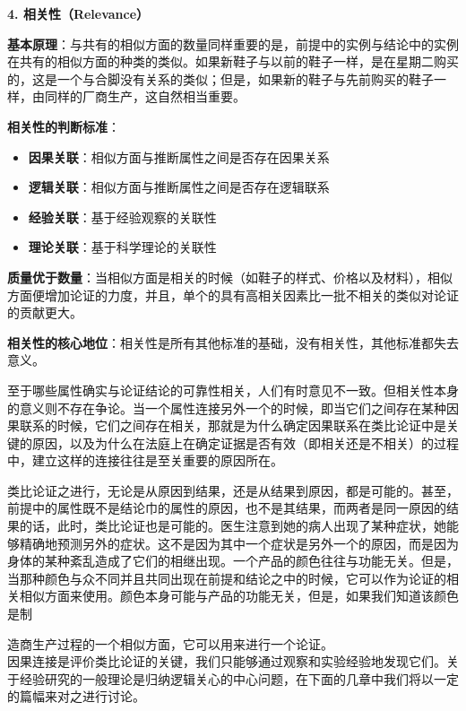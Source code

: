 \begin{theorembox}[title=标准四：相关性的核心地位]

\textbf{4. 相关性（Relevance）}

\textbf{基本原理}：与共有的相似方面的数量同样重要的是，前提中的实例与结论中的实例在共有的相似方面的种类的类似。如果新鞋子与以前的鞋子一样，是在星期二购买的，这是一个与合脚没有关系的类似；但是，如果新的鞋子与先前购买的鞋子一样，由同样的厂商生产，这自然相当重要。

\textbf{相关性的判断标准}：
\begin{itemize}
\item \textbf{因果关联}：相似方面与推断属性之间是否存在因果关系
\item \textbf{逻辑关联}：相似方面与推断属性之间是否存在逻辑联系
\item \textbf{经验关联}：基于经验观察的关联性
\item \textbf{理论关联}：基于科学理论的关联性
\end{itemize}

\textbf{质量优于数量}：当相似方面是相关的时候（如鞋子的样式、价格以及材料），相似方面便增加论证的力度，并且，单个的具有高相关因素比一批不相关的类似对论证的贡献更大。

\textbf{相关性的核心地位}：相关性是所有其他标准的基础，没有相关性，其他标准都失去意义。
\end{theorembox}

至于哪些属性确实与论证结论的可靠性相关，人们有时意见不一致。但相关性本身的意义则不存在争论。当一个属性连接另外一个的时候，即当它们之间存在某种因果联系的时候，它们之间存在相关，那就是为什么确定因果联系在类比论证中是关键的原因，以及为什么在法庭上在确定证据是否有效（即相关还是不相关）的过程中，建立这样的连接往往是至关重要的原因所在。

类比论证之进行，无论是从原因到结果，还是从结果到原因，都是可能的。甚至，前提中的属性既不是结论巾的属性的原因，也不是其结果，而两者是同一原因的结果的话，此时，类比论证也是可能的。医生注意到她的病人出现了某种症状，她能够精确地预测另外的症状。这不是因为其中一个症状是另外一个的原因，而是因为身体的某种紊乱造成了它们的相继出现。一个产品的颜色往往与功能无关。但是，当那种颜色与众不同并且共同出现在前提和结论之中的时候，它可以作为论证的相关相似方面来使用。颜色本身可能与产品的功能无关，但是，如果我们知道该颜色是制

造商生产过程的一个相似方面，它可以用来进行一个论证。\\
因果连接是评价类比论证的关键，我们只能够通过观察和实验经验地发现它们。关于经验研究的一般理论是归纳逻辑关心的中心问题，在下面的几章中我们将以一定的篇幅来对之进行讨论。

